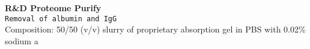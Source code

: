 \textbf{R&D Proteome Purify} 
\\
\texttt{Removal of albumin and IgG}
\\
Composition: 50/50 (v/v) slurry of proprietary absorption gel in PBS with 0.02\% sodium a
